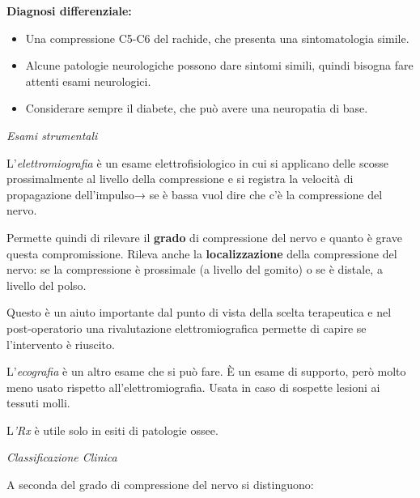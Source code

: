 \documentclass[]{article}
\begin{document}
\textbf{Diagnosi differenziale:}

\begin{itemize}
\item
  Una compressione C5-C6 del rachide, che presenta una sintomatologia
  simile.
\item
  Alcune patologie neurologiche possono dare sintomi simili, quindi
  bisogna fare attenti esami neurologici.
\item
  Considerare sempre il diabete, che può avere una neuropatia di base.
\end{itemize}

\emph{Esami strumentali}

L'\emph{elettromiografia} è un esame elettrofisiologico in cui si
applicano delle scosse prossimalmente al livello della compressione e si
registra la velocità di propagazione dell'impulso→ se è bassa vuol dire
che c'è la compressione del nervo.

Permette quindi di rilevare il \textbf{grado} di compressione del nervo
e quanto è grave questa compromissione. Rileva anche la
\textbf{localizzazione} della compressione del nervo: se la compressione
è prossimale (a livello del gomito) o se è distale, a livello del polso.

Questo è un aiuto importante dal punto di vista della scelta terapeutica
e nel post-operatorio una rivalutazione elettromiografica permette di
capire se l'intervento è riuscito.

L'\emph{ecografia} è un altro esame che si può fare. È un esame di
supporto, però molto meno usato rispetto all'elettromiografia. Usata in
caso di sospette lesioni ai tessuti molli.

L\emph{'Rx} è utile solo in esiti di patologie ossee.

\emph{Classificazione Clinica }

A seconda del grado di compressione del nervo si distinguono:
\end{document}
